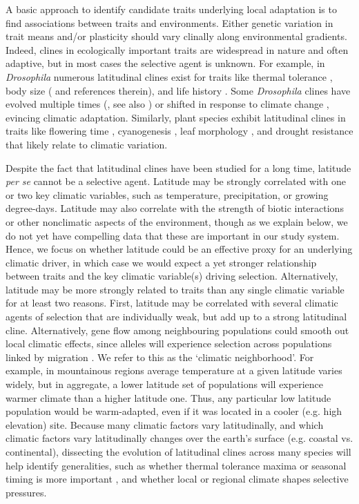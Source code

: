 \documentclass[11pt, oneside]{article}
\begin{document}
A basic approach to identify candidate traits underlying local adaptation is to find associations between traits and environments. Either genetic variation in trait means and/or plasticity should vary clinally along environmental gradients. Indeed, clines in ecologically important traits are widespread in nature \citep{Endler_1977} and often adaptive, but in most cases the selective agent is unknown. For example, in \textit{Drosophila} numerous latitudinal clines exist for traits like thermal tolerance \citep{Hoffmann_etal_2002}, body size (\cite{Coyne_Beecham_1987} and references therein), and life history \citep{Schmidt_etal_2005}. Some \textit{Drosophila} clines have evolved multiple times (\cite{Oakeshott_etal_1982, Huey_etal_2000}, see also \cite{Bradshaw_Holzapfel_2001}) or shifted in response to climate change \citep{Umina_etal_2005}, evincing climatic adaptation. Similarly, plant species exhibit latitudinal clines in traits like flowering time \citep{Stinchcombe_etal_2004}, cyanogenesis \citep{Kooyers_Olsen_2012}, leaf morphology \citep{Hopkins_etal_2008, Stock_etal_2014}, and drought resistance \citep{Kooyers_etal_2015} that likely relate to climatic variation. 

Despite the fact that latitudinal clines have been studied for a long time, latitude \textit{per se} cannot be a selective agent. Latitude may be strongly correlated with one or two key climatic variables, such as temperature, precipitation, or growing degree-days. Latitude may also correlate with the strength of biotic interactions \citep{Schemske_etal_2009} or other nonclimatic aspects of the environment, though as we explain below, we do not yet have compelling data that these are important in our study system. Hence, we focus on whether latitude could be an effective proxy for an underlying climatic driver, in which case we would expect a yet stronger relationship between traits and the key climatic variable(s) driving selection. Alternatively, latitude may be more strongly related to traits than any single climatic variable for at least two reasons. First, latitude may be correlated with several climatic agents of selection that are individually weak, but add up to a strong latitudinal cline. Alternatively, gene flow among neighbouring populations could smooth out local climatic effects, since alleles will experience selection across populations linked by migration \citep{Slatkin_1978, Paul_etal_2011, Hadfield_2016}. We refer to this as the `climatic neighborhood'. For example, in mountainous regions average temperature at a given latitude varies widely, but in aggregate, a lower latitude set of populations will experience warmer climate than a higher latitude one. Thus, any particular low latitude population would be warm-adapted, even if it was located in a cooler (e.g. high elevation) site. Because many climatic factors vary latitudinally, and which climatic factors vary latitudinally changes over the earth's surface (e.g. coastal vs. continental), dissecting the evolution of latitudinal clines across many species will help identify generalities, such as whether thermal tolerance maxima or seasonal timing is more important \citep{Bradshaw_Holzapfel_2008}, and whether local or regional climate shapes selective pressures.
\end{document}
